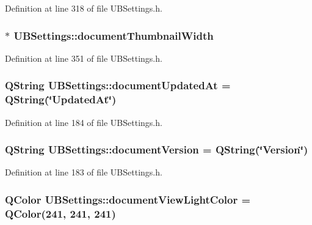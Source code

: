 Definition at line 318 of file U\-B\-Settings.\-h.

\hypertarget{class_u_b_settings_a6a94e430347f10aa5882ef4c26cbe918}{
\subsubsection[{document\-Thumbnail\-Width}]{$\ast$ U\-B\-Settings\-::document\-Thumbnail\-Width}}\label{db/d66/class_u_b_settings_a6a94e430347f10aa5882ef4c26cbe918}


Definition at line 351 of file U\-B\-Settings.\-h.

\hypertarget{class_u_b_settings_aa9801d52a997e3a5f20c6ea533074f94}{
\subsubsection[{document\-Updated\-At}]{\setlength{\rightskip}{0pt plus 5cm}Q\-String U\-B\-Settings\-::document\-Updated\-At = Q\-String(\char`\"{}Updated\-At\char`\"{})\hspace{0.3cm}{\ttfamily [static]}}}\label{db/d66/class_u_b_settings_aa9801d52a997e3a5f20c6ea533074f94}


Definition at line 184 of file U\-B\-Settings.\-h.

\hypertarget{class_u_b_settings_a944257fa012bc74d251227ea8a6afb99}{
\subsubsection[{document\-Version}]{\setlength{\rightskip}{0pt plus 5cm}Q\-String U\-B\-Settings\-::document\-Version = Q\-String(\char`\"{}Version\char`\"{})\hspace{0.3cm}{\ttfamily [static]}}}\label{db/d66/class_u_b_settings_a944257fa012bc74d251227ea8a6afb99}


Definition at line 183 of file U\-B\-Settings.\-h.

\hypertarget{class_u_b_settings_add3118144065710146552c7f61fdf491}{
\subsubsection[{document\-View\-Light\-Color}]{\setlength{\rightskip}{0pt plus 5cm}Q\-Color U\-B\-Settings\-::document\-View\-Light\-Color = Q\-Color(241, 241, 241)\hspace{0.3cm}{\ttfamily [static]}}}\label{db/d66/class_u_b_settings_add3118144065710146552c7f61fdf491}


